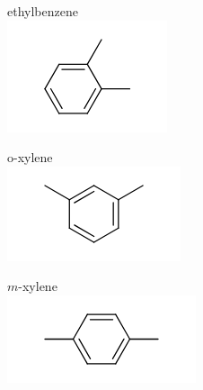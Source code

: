 \documentclass[10pt]{article}
\begin{document}
ethylbenzene\\
\includegraphics{smile-27855cb0823ad2fc00deef508e38e81b7ec590c2}

o-xylene\\
\includegraphics{smile-8945d422a11b2019efcb836d4bb5b84efc050702}

$m$-xylene\\
\includegraphics{smile-40ef967be8f437b4697577099576d2725532412d}
\end{document}
